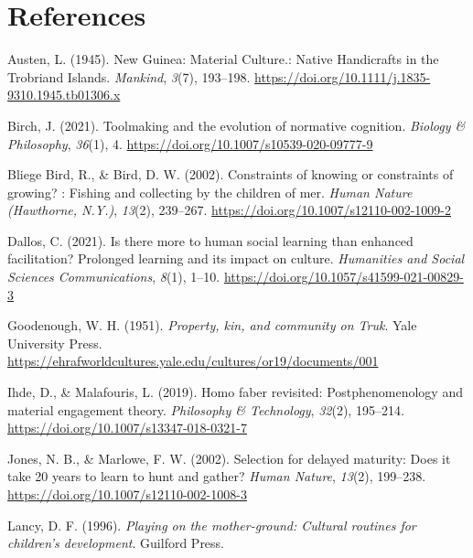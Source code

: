 \documentclass[
  11pt,
]{article}
\newlength{\cslhangindent}
\newenvironment{CSLReferences}[2] %
 {\begin{list}{}{%
  \setlength{\itemindent}{0pt}
  \setlength{\leftmargin}{0pt}
  \setlength{\parsep}{0pt}
  \ifodd #1
   \setlength{\leftmargin}{\cslhangindent}
   \setlength{\itemindent}{-1\cslhangindent}
  \fi
  \setlength{\itemsep}{#2\baselineskip}}}
 {\end{list}}
\begin{document}
\section*{References}\label{references}

\label{refs}
\begin{CSLReferences}{1}{0}
Austen, L. (1945). New Guinea: Material Culture.: Native Handicrafts in the Trobriand Islands. \emph{Mankind}, \emph{3}(7), 193--198. \url{https://doi.org/10.1111/j.1835-9310.1945.tb01306.x}

Birch, J. (2021). Toolmaking and the evolution of normative cognition. \emph{Biology \& Philosophy}, \emph{36}(1), 4. \url{https://doi.org/10.1007/s10539-020-09777-9}

Bliege Bird, R., \& Bird, D. W. (2002). Constraints of knowing or constraints of growing? : Fishing and collecting by the children of mer. \emph{Human Nature (Hawthorne, N.Y.)}, \emph{13}(2), 239--267. \url{https://doi.org/10.1007/s12110-002-1009-2}

Dallos, C. (2021). Is there more to human social learning than enhanced facilitation? Prolonged learning and its impact on culture. \emph{Humanities and Social Sciences Communications}, \emph{8}(1), 1--10. \url{https://doi.org/10.1057/s41599-021-00829-3}

Goodenough, W. H. (1951). \emph{Property, kin, and community on Truk}. Yale University Press. \url{https://ehrafworldcultures.yale.edu/cultures/or19/documents/001}

Ihde, D., \& Malafouris, L. (2019). Homo faber revisited: Postphenomenology and material engagement theory. \emph{Philosophy \& Technology}, \emph{32}(2), 195--214. \url{https://doi.org/10.1007/s13347-018-0321-7}

Jones, N. B., \& Marlowe, F. W. (2002). Selection for delayed maturity: Does it take 20 years to learn to hunt and gather? \emph{Human Nature}, \emph{13}(2), 199--238. \url{https://doi.org/10.1007/s12110-002-1008-3}

Lancy, D. F. (1996). \emph{Playing on the mother-ground: Cultural routines for children's development}. Guilford Press.


\end{CSLReferences}
\end{document}
